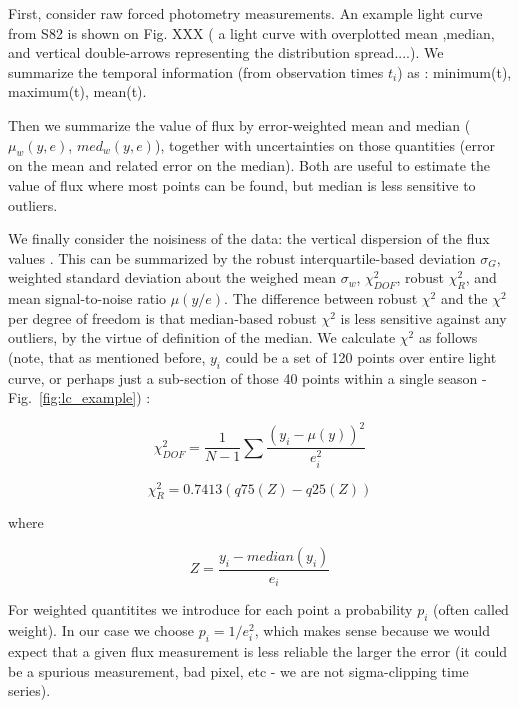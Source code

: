 \documentclass[fleqn,usenatbib]{mnras}  %
\begin{document}
First, consider raw forced photometry measurements.  An example light curve  from S82 is shown on Fig. XXX   ( a light curve with overplotted mean ,median,  and vertical double-arrows representing the distribution spread....).  We summarize the temporal information  (from observation times $t_{i}$) as : minimum(t), maximum(t), mean(t). 


Then we summarize the value of flux by error-weighted mean and median ($\mu_{w}(y,e)$, $med_{w}(y,e)$), together with uncertainties on those quantities (error on the mean and related error on the median). Both are useful to estimate the value of flux where most points can be found, but median is less sensitive to outliers. 

We finally consider the noisiness of the data: the vertical dispersion of the flux values . This can be summarized by the robust interquartile-based deviation $\sigma_{G}$, weighted standard deviation about the weighed mean $\sigma_{w}$, $\chi^{2}_{DOF}$, robust $\chi^{2}_{R}$, and mean signal-to-noise ratio $\mu(y / e)$.  The difference between robust $\chi^{2}$ and the $\chi^{2}$ per degree of freedom is that median-based robust $\chi^{2}$ is less sensitive against any outliers, by the virtue of definition of the median. We calculate $\chi^{2}$ as follows (note, that as mentioned before, $y_{i}$ could be a set of 120 points over entire light curve, or perhaps just a sub-section of those 40 points within a single season  -  Fig.~\ref{fig:lc_example}) : 

\begin{equation}
\chi^{2}_{DOF}  = \frac{1}{N-1} \sum{\frac{(y_{i} - \mu(y))^{2}}{e_{i}^{2}}}
\end{equation}


\begin{equation}
\chi^{2}_{R} = 0.7413 (q75(Z) - q25(Z))
\end{equation}

where 

\begin{equation}
Z = \frac{y_{i} - median(y_{i})}{e_{i}}
\end{equation}


For weighted quantitites we introduce for each point a probability $p_{i}$ (often called weight).  In our case we choose $p_{i} = 1 / e_{i}^{2}$, which makes sense because we would expect that a given flux measurement is less reliable the larger the error (it could be a spurious measurement, bad pixel, etc - we are not sigma-clipping time series). 
\end{document}
